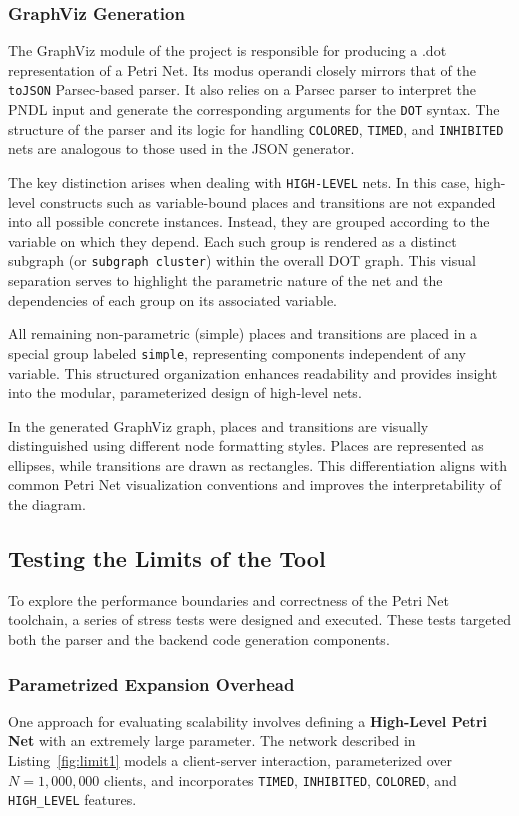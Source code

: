 \documentclass[12pt]{article}
\begin{document}
        
        \subsubsection{GraphViz Generation}
            The GraphViz module of the project is responsible for producing a .dot representation of a Petri Net. Its modus operandi closely mirrors that of the \texttt{toJSON} Parsec-based parser. It also relies on a Parsec parser to interpret the PNDL input and generate the corresponding arguments for the \texttt{DOT} syntax. The structure of the parser and its logic for handling \texttt{COLORED}, \texttt{TIMED}, and \texttt{INHIBITED} nets are analogous to those used in the JSON generator.
            
            The key distinction arises when dealing with \texttt{HIGH-LEVEL} nets. In this case, high-level constructs such as variable-bound places and transitions are not expanded into all possible concrete instances. Instead, they are grouped according to the variable on which they depend. Each such group is rendered as a distinct subgraph (or \texttt{subgraph cluster}) within the overall DOT graph. This visual separation serves to highlight the parametric nature of the net and the dependencies of each group on its associated variable.
            
            All remaining non-parametric (simple) places and transitions are placed in a special group labeled \texttt{simple}, representing components independent of any variable. This structured organization enhances readability and provides insight into the modular, parameterized design of high-level nets.

            In the generated GraphViz graph, places and transitions are visually distinguished using different node formatting styles. Places are represented as ellipses, while transitions are drawn as rectangles. This differentiation aligns with common Petri Net visualization conventions and improves the interpretability of the diagram.
    

    \subsection{Testing the Limits of the Tool}   
        To explore the performance boundaries and correctness of the Petri Net toolchain, a series of stress tests were designed and executed. These tests targeted both the parser and the backend code generation components.
        \subsubsection{Parametrized Expansion Overhead}
            One approach for evaluating scalability involves defining a \textbf{High-Level Petri Net} with an extremely large parameter. The network described in Listing~\ref{fig:limit1} models a client-server interaction, parameterized over $N = 1{,}000{,}000$ clients, and incorporates \texttt{TIMED}, \texttt{INHIBITED}, \texttt{COLORED}, and \texttt{HIGH\_LEVEL} features.
\end{document}
